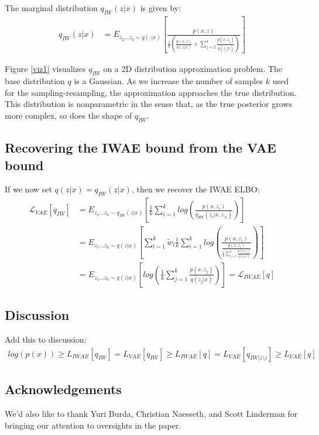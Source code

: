 \documentclass{article}
\begin{document}
The marginal distribution $q_{IW}(z|x)$ is given by:
\begin{align} 
    q_{IW}(z|x) &= E_{z_{2}...z_{k} \sim q(\cdot |x)} \left[ \frac{p(x,z)}{  \frac{1}{k} \left( \frac{p(x,z)}{q(z|x)}+ \sum_{j=2}^k \frac{p(x,z_j)}{q(z_j|x)} \right) } \right] \label{marg} 
\end{align}

Figure \ref{viz1} visualizes $q_{IW}$ on a 2D distribution approximation problem. The base distribution $q$ is a Gaussian.  As we increase the number of samples $k$ used for the sampling-resampling, the approximation approaches the true distribution. This distribution is nonparametric in the sense that, as the true posterior grows more complex, so does the shape of $q_{IW}$.






\subsection{Recovering the IWAE bound from the VAE bound}

If we now set $q(z|x) = q_{IW}(z|x)$, then we recover the IWAE ELBO:
\begin{align}
        \mathcal{L}_{VAE}[q_{IW}]
        &= E_{z_{1}...z_{k} \sim q_{IW}(z|x)} \left[  \frac{1}{k}\sum_{i=1}^k log\left(\frac{p(x,z_i)}{q_{IW}(z_i|x,z_{\setminus i})}  \right)  \right] \\
    &= E_{z_{1}...z_{k} \sim q(z|x)} \left[ \sum_{l=1}^k \tilde w_l \frac{1}{k}\sum_{i=1}^k log\left(\frac{p(x,z_i)}{\frac{p(x,z_i)}{\frac{1}{k}   \sum_{j=1}^k \frac{p(x,z_j)}{q(z_j|x)}}}  \right)  \right] \\
    &= E_{z_{1}...z_{k} \sim q(z|x)} \left[  log\left(\frac{1}{k}\sum_{j=1}^k \frac{p(x,z_j)}{q(z_j|x)}  \right)  \right] = \mathcal{L}_{IWAE}[q]
\end{align}









\subsection{Discussion}
Add this to discussion:\\

\begin{align} 
    log(p(x)) \geq L_{IWAE}[q_{IW}] = L_{VAE}[q_{IW}] \geq L_{IWAE}[q] = L_{VAE}[q_{IW|z\setminus i}] \geq L_{VAE}[q] \nonumber
\end{align}



\subsection{Acknowledgements}
We'd also like to thank Yuri Burda, Christian Naesseth, and Scott Linderman for bringing our attention to oversights in the paper.
\end{document}
